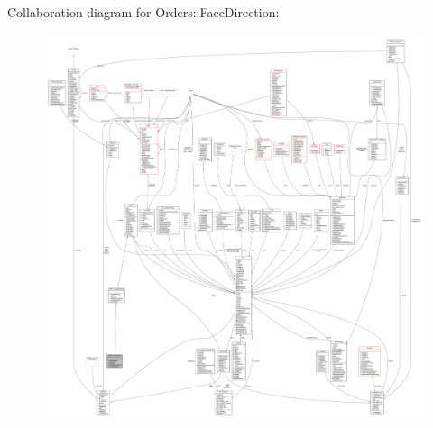 Collaboration diagram for Orders\+:\+:Face\+Direction\+:
\nopagebreak
\begin{figure}[H]
\begin{center}
\leavevmode
\includegraphics[width=350pt]{d2/d46/classOrders_1_1FaceDirection__coll__graph}
\end{center}
\end{figure}
